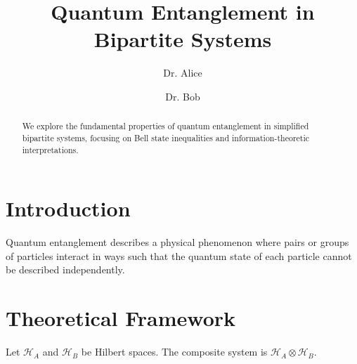 \documentclass{article}
\title{Quantum Entanglement in Bipartite Systems}
\author{Dr. Alice \and Dr. Bob}
\begin{document}
\maketitle
\begin{abstract}
We explore the fundamental properties of quantum entanglement in simplified bipartite systems, focusing on Bell state inequalities and information-theoretic interpretations.
\end{abstract}
\section{Introduction}
Quantum entanglement describes a physical phenomenon where pairs or groups of particles interact in ways such that the quantum state of each particle cannot be described independently.
\section{Theoretical Framework}
Let $\mathcal{H}_A$ and $\mathcal{H}_B$ be Hilbert spaces. The composite system is $\mathcal{H}_A \otimes \mathcal{H}_B$.
\end{document}
